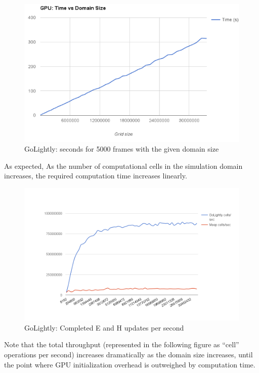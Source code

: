 \begin{figure}[H]
	\centering
	\includegraphics[width=\textwidth,
	keepaspectratio]{gpu_time_vs_domain_size.png}
	\caption{GoLightly: seconds for 5000 frames with the given domain size}
	\label{fig:gpuTimeVsDomainSize}
\end{figure}

As expected, As the number of computational cells in the simulation domain increases, the required computation time increases linearly.

\begin{figure}[H]
	\centering
	\includegraphics[width=\textwidth,
	keepaspectratio]{cells-per-second.png}
	\caption{GoLightly: Completed E and H updates per second}
	\label{fig:gridSizeVsComputeTime}
\end{figure}

Note that the total throughput (represented in the following figure as “cell” operations per second) increases dramatically as the domain size increases, until the point where GPU initialization overhead is outweighed by computation time.

